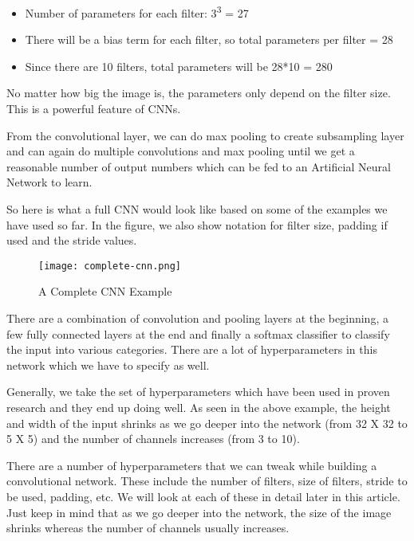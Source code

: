 \begin{itemize}
  \item Number of parameters for each filter: 3\textsuperscript{3} = 27
  \item There will be a bias term for each filter, so total parameters per filter = 28
  \item Since there are 10 filters, total parameters will be 28*10 = 280
\end{itemize}

No matter how big the image is, the parameters only depend on the filter size. This is a powerful feature of CNNs.
\par
From the convolutional layer, we can do max pooling to create subsampling layer and can again do multiple convolutions and max pooling until we get a reasonable number of output numbers which can be fed to an Artificial Neural Network to learn.
\par
So here is what a full CNN would look like based on some of the examples we have used so far. In the figure, we also show notation for filter size, padding if used and the stride values.
\begin{figure}
  \caption{A Complete CNN Example}
  \texttt{[image: complete-cnn.png]}
\end{figure}

There are a combination of convolution and pooling layers at the beginning, a few fully connected layers at the end and finally a softmax classifier to classify the input into various categories. There are a lot of hyperparameters in this network which we have to specify as well.
\par
Generally, we take the set of hyperparameters which have been used in proven research and they end up doing well. As seen in the above example, the height and width of the input shrinks as we go deeper into the network (from 32 X 32 to 5 X 5) and the number of channels increases (from 3 to 10).
\par
There are a number of hyperparameters that we can tweak while building a convolutional network.
These include the number of filters, size of filters, stride to be used, padding, etc. We will look at each of these in detail later in this article. Just keep in mind that as we go deeper into the network, the size of the image shrinks whereas the number of channels usually increases.

